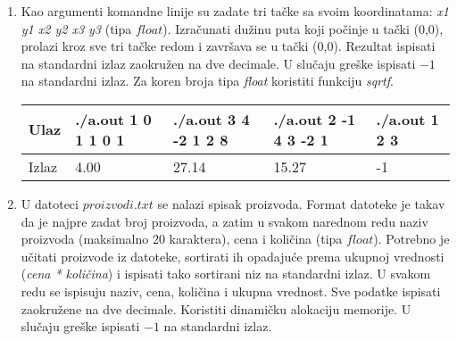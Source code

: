 \bigskip

\begin{enumerate}
\item Kao argumenti komandne linije su zadate tri ta\v cke sa svoim koordinatama: \emph{x1 y1 x2 y2 x3 y3} (tipa $float$). Izra\v cunati du\v zinu puta koji po\v cinje u ta\v cki (0,0), prolazi kroz sve tri ta\v cke redom i zavr\v sava se u ta\v cki (0,0). Rezultat ispisati na standardni izlaz zaokru\v zen na dve decimale. U slu\v caju gre\v ske ispisati $-1$ na standardni izlaz. Za koren broja tipa \emph{float} koristiti funkciju \emph{sqrtf}.

\small
\begin{tabular}{ |l|l|l|l|l| }
\hline
  Ulaz & ./a.out 1 0 1 1 0 1 & ./a.out 3 4 -2 1 2 8 & ./a.out 2 -1 4 3 -2 1 & ./a.out 1 2 3\\ \hline
  Izlaz & 4.00 & 27.14 & 15.27 & -1 \\ \hline
\end{tabular}
\normalsize

\item U datoteci $proizvodi.txt$ se nalazi spisak proizvoda. Format datoteke je takav da je najpre zadat broj proizvoda, a zatim u svakom narednom redu naziv proizvoda (maksimalno 20 karaktera), cena i koli\v cina (tipa $float$).  Potrebno je u\v citati proizvode iz datoteke, sortirati ih opadaju\' ce prema ukupnoj vrednosti (\emph{cena * koli\v cina}) i ispisati tako sortirani niz na standardni izlaz. U svakom redu se ispisuju naziv, cena, koli\v cina i ukupna vrednost. Sve podatke ispisati zaokru\v zene na dve decimale. Koristiti dinami\v cku alokaciju memorije. U slu\v caju gre\v ske ispisati $-1$ na standardni izlaz.


\end{enumerate}
